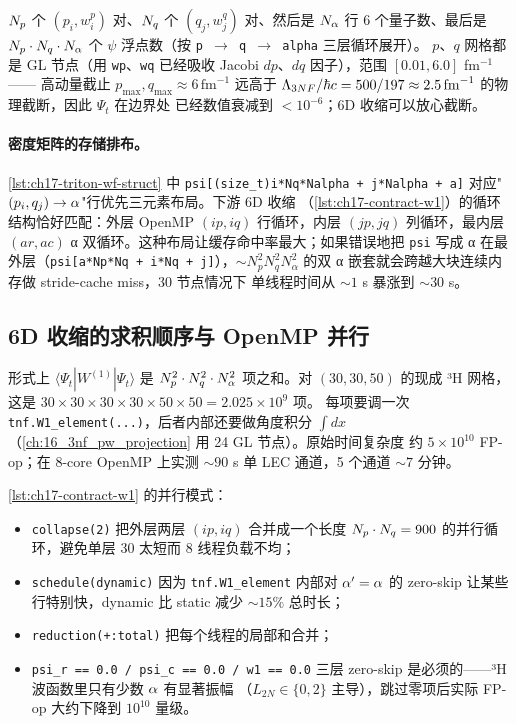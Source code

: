 \(N_p\) 个 \((p_i, w^p_i)\) 对、\(N_q\) 个 \((q_j, w^q_j)\) 对、然后是
\(N_\alpha\) 行 6 个量子数、最后是 \(N_p \cdot N_q \cdot N_\alpha\) 个 \(\psi\)
浮点数（按 \texttt{p $\to$ q $\to$ alpha} 三层循环展开）。
\(p\)、\(q\) 网格都是 GL 节点（用 \texttt{wp}、\texttt{wq} 已经吸收 Jacobi
\(dp\)、\(dq\) 因子），范围 \([0.01, 6.0]\) fm\(^{-1}\) —— 高动量截止
\(p_{\max}, q_{\max} \approx 6\,\mathrm{fm}^{-1}\) 远高于 \(\Lambda_{3NF}/\hbar c =
500/197 \approx 2.5\,\mathrm{fm}^{-1}\) 的物理截断，因此 \(\Psi_t\) 在边界处
已经数值衰减到 \(<10^{-6}\)；6D 收缩可以放心截断。

\paragraph{密度矩阵的存储排布。}
\cref{lst:ch17-triton-wf-struct} 中 \texttt{psi[(size\_t)i*Nq*Nalpha + j*Nalpha + a]}
对应"\((p_i, q_j) \to \alpha\)"行优先三元素布局。下游 6D 收缩
（\cref{lst:ch17-contract-w1}）的循环结构恰好匹配：外层 OpenMP
\((ip, iq)\) 行循环，内层 \((jp, jq)\) 列循环，最内层 \((ar, ac)\)
α 双循环。这种布局让缓存命中率最大；如果错误地把 \texttt{psi} 写成
α 在最外层（\texttt{psi[a*Np*Nq + i*Nq + j]}），\(\sim N_p^2 N_q^2 N_\alpha^2\)
的双 α 嵌套就会跨越大块连续内存做 stride-cache miss，30 节点情况下
单线程时间从 \(\sim 1\) s 暴涨到 \(\sim 30\) s。

\subsection{6D 收缩的求积顺序与 OpenMP 并行}
\label{subsec:ch17-6d-contraction}

形式上 \(\langle\Psi_t|W^{(1)}|\Psi_t\rangle\) 是 \(N_p^2 \cdot N_q^2 \cdot N_\alpha^2\)
项之和。对 \((30, 30, 50)\) 的现成 ³H 网格，这是
\(30 \times 30 \times 30 \times 30 \times 50 \times 50 = 2.025 \times 10^9\) 项。
每项要调一次 \texttt{tnf.W1\_element(...)}，后者内部还要做角度积分
\(\int dx\)（\cref{ch:16_3nf_pw_projection} 用 24 GL 节点）。原始时间复杂度
约 \(5\times 10^{10}\) FP-op；在 8-core OpenMP 上实测 \(\sim 90\) s
单 LEC 通道，5 个通道 \(\sim 7\) 分钟。

\cref{lst:ch17-contract-w1} 的并行模式：
\begin{itemize}
  \item \texttt{collapse(2)} 把外层两层 \((ip, iq)\) 合并成一个长度
        \(N_p \cdot N_q = 900\) 的并行循环，避免单层 30 太短而 8 线程负载不均；
  \item \texttt{schedule(dynamic)} 因为 \texttt{tnf.W1\_element} 内部对
        \(\alpha' = \alpha\) 的 zero-skip 让某些行特别快，dynamic 比
        static 减少 \(\sim 15\%\) 总时长；
  \item \texttt{reduction(+:total)} 把每个线程的局部和合并；
  \item \texttt{psi\_r == 0.0 / psi\_c == 0.0 / w1 == 0.0} 三层 zero-skip
        是必须的——³H 波函数里只有少数 \(\alpha\) 有显著振幅
        （\(L_{2N} \in \{0, 2\}\) 主导），跳过零项后实际 FP-op 大约下降到
        \(10^{10}\) 量级。
\end{itemize}

